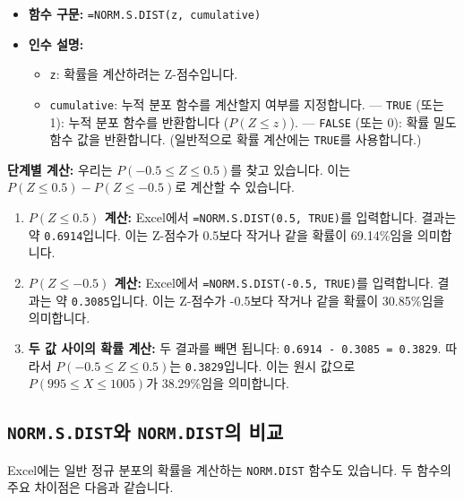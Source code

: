\documentclass[11pt,a4paper]{book}
\theoremstyle{definition}
\begin{document}
\begin{itemize}
    \item \textbf{함수 구문:} \texttt{=NORM.S.DIST(z, cumulative)}
    \item \textbf{인수 설명:}
    \begin{itemize}
        \item \texttt{z}: 확률을 계산하려는 Z-점수입니다.
        \item \texttt{cumulative}: 누적 분포 함수를 계산할지 여부를 지정합니다.
            --- \texttt{TRUE} (또는 1): 누적 분포 함수를 반환합니다 ($P(Z \le z)$).
            --- \texttt{FALSE} (또는 0): 확률 밀도 함수 값을 반환합니다. (일반적으로 확률 계산에는 \texttt{TRUE}를 사용합니다.)
    \end{itemize}
\end{itemize}

\begin{examplebox}
    \textbf{단계별 계산:}
    우리는 $P(-0.5 \le Z \le 0.5)$를 찾고 있습니다. 이는 $P(Z \le 0.5) - P(Z \le -0.5)$로 계산할 수 있습니다.

    \begin{enumerate}
        \item \textbf{$P(Z \le 0.5)$ 계산:}
        Excel에서 \texttt{=NORM.S.DIST(0.5, TRUE)}를 입력합니다.
        결과는 약 \texttt{0.6914}입니다.
        이는 Z-점수가 0.5보다 작거나 같을 확률이 69.14\%임을 의미합니다.

        \item \textbf{$P(Z \le -0.5)$ 계산:}
        Excel에서 \texttt{=NORM.S.DIST(-0.5, TRUE)}를 입력합니다.
        결과는 약 \texttt{0.3085}입니다.
        이는 Z-점수가 -0.5보다 작거나 같을 확률이 30.85\%임을 의미합니다.

        \item \textbf{두 값 사이의 확률 계산:}
        두 결과를 빼면 됩니다: \texttt{0.6914 - 0.3085 = 0.3829}.
        따라서 $P(-0.5 \le Z \le 0.5)$는 \texttt{0.3829}입니다.
        이는 원시 값으로 $P(995 \le X \le 1005)$가 38.29\%임을 의미합니다.
    \end{enumerate}
\end{examplebox}

\subsection{\texttt{NORM.S.DIST}와 \texttt{NORM.DIST}의 비교}
Excel에는 일반 정규 분포의 확률을 계산하는 \texttt{NORM.DIST} 함수도 있습니다.
두 함수의 주요 차이점은 다음과 같습니다.
\end{document}
